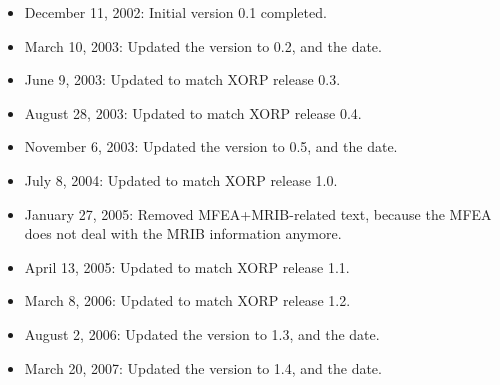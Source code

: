 \documentclass[11pt]{article}
\begin{document}
\begin{itemize}

  \item December 11, 2002: Initial version 0.1 completed.

  \item March 10, 2003: Updated the version to 0.2, and the date.

  \item June 9, 2003: Updated to match XORP release 0.3.

  \item August 28, 2003: Updated to match XORP release 0.4.

  \item November 6, 2003: Updated the version to 0.5, and the date.

  \item July 8, 2004: Updated to match XORP release 1.0.

  \item January 27, 2005: Removed MFEA+MRIB-related text, because the MFEA
  does not deal with the MRIB information anymore.

  \item April 13, 2005: Updated to match XORP release 1.1.

  \item March 8, 2006: Updated to match XORP release 1.2.

  \item August 2, 2006: Updated the version to 1.3, and the date.

  \item March 20, 2007: Updated the version to 1.4, and the date.

\end{itemize}




\end{document}
